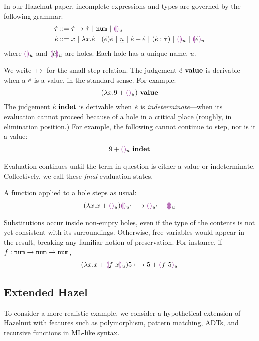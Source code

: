 
In our Hazelnut paper, incomplete expressions and types are governed by the
following grammar:
\begin{align*}
  \dot{\tau} & ::=
  \dot{\tau} \rightarrow \dot{\tau} ~\vert~
  \texttt{num} ~\vert~
  \textcolor{violet}{\llparenthesis}\textcolor{violet}{\rrparenthesis}_{u}
  \\
  \dot{e} & ::=   x ~\vert~
  \lambda x.\dot{e} ~\vert~
  (\dot{e})\dot{e} ~\vert~
  \underline{n} ~\vert~
  \dot{e} + \dot{e} ~\vert~
  (\dot{e} : \dot{\tau}) ~\vert~
  \textcolor{violet}{\llparenthesis}\textcolor{violet}{\rrparenthesis}_{u} ~\vert~
  \textcolor{violet}{\llparenthesis}\dot{e}\textcolor{violet}{\rrparenthesis}_{u}
\end{align*}
where $\textcolor{violet}{\llparenthesis}\textcolor{violet}{\rrparenthesis}_{u}$ and $\textcolor{violet}{\llparenthesis}\dot{e}\textcolor{violet}{\rrparenthesis}_{u}$ are holes. Each hole has a unique
name, $u$.

We write $\mapsto$ for the small-step relation. The judgement
${\dot{e}} ~\mathbf{value}$ is derivable when a $\dot{e}$ is a value, in the standard
sense. For example:
\begin{align*}
  {(\lambda x. 9 + \textcolor{violet}{\llparenthesis}\textcolor{violet}{\rrparenthesis}_{u})} ~\mathbf{value}
\end{align*}
The judgement ${\dot{e}} ~\mathbf{indet}$ is derivable when $\dot{e}$ is
\textit{indeterminate}---when its evaluation cannot proceed because of a
hole in a critical place (roughly, in elimination position.) For example,
the following cannot continue to step, nor is it a value:
\begin{align*}
  {9 + \textcolor{violet}{\llparenthesis}\textcolor{violet}{\rrparenthesis}_{u}} ~\mathbf{indet}
\end{align*}

Evaluation continues until the term in question is either a value or
indeterminate. Collectively, we call these \emph{final} evaluation states.

A function applied to a hole steps as usual:
\begin{align*}
      {
        (\lambda x.x + \textcolor{violet}{\llparenthesis}\textcolor{violet}{\rrparenthesis}_{u})\textcolor{violet}{\llparenthesis}\textcolor{violet}{\rrparenthesis}_{u'}
      } \longmapsto {
        \textcolor{violet}{\llparenthesis}\textcolor{violet}{\rrparenthesis}_{u'} + \textcolor{violet}{\llparenthesis}\textcolor{violet}{\rrparenthesis}_{u}
      }
\end{align*}

Substitutions occur inside non-empty holes, even if the type of the
contents is not yet consistent with its surroundings. Otherwise, free
variables would appear in the result, breaking any familiar notion of
preservation. For instance, if $f : \texttt{num} \rightarrow \texttt{num} \rightarrow \texttt{num}$,
\begin{align*}
  {
        (\lambda x.x + \textcolor{violet}{\llparenthesis}f~x\textcolor{violet}{\rrparenthesis}_{u})5
      } \longmapsto {
        5 + \textcolor{violet}{\llparenthesis}f~5\textcolor{violet}{\rrparenthesis}_{u}
      }
\end{align*}

\subsection{Extended Hazel}
To consider a more realistic example, we consider a hypothetical extension
of Hazelnut with features such as polymorphism, pattern matching, ADTs, and
recursive functions in ML-like syntax.

